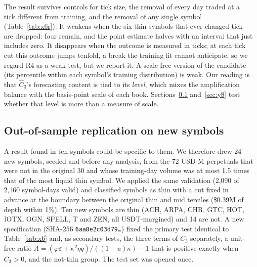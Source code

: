 \documentclass[12pt]{article}
\theoremstyle{definition}
\theoremstyle{remark}
\begin{document}
The result survives controls for tick size, the removal of every day traded at a tick different from training, and the removal of any single symbol (Table~\ref{tab:x6r}). It weakens when the six thin symbols that ever changed tick are dropped: four remain, and the point estimate halves with an interval that just includes zero. It disappears when the outcome is measured in ticks; at each tick cut this outcome jumps tenfold, a break the training fit cannot anticipate, so we regard R4 as a weak test, but we report it. A scale-free version of the candidate (its percentile within each symbol's training distribution) is weak. Our reading is that $\hat C_3$'s forecasting content is tied to its \emph{level}, which mixes the amplification balance with the basis-point scale of each book. Sections~\ref{sec:y6} and~\ref{sec:y8} test whether that level is more than a measure of scale.

\subsection{Out-of-sample replication on new symbols}\label{sec:y6}
A result found in ten symbols could be specific to them. We therefore drew 24 new symbols, seeded and before any analysis, from the 72 USD-M perpetuals that were not in the original 30 and whose training-day volume was at most 1.5 times that of the most liquid thin symbol. We applied the same validation (2{,}090 of 2{,}160 symbol-days valid) and classified symbols as thin with a cut fixed in advance at the boundary between the original thin and mid terciles (\$0.39M of depth within 1\%). Ten new symbols are thin (ACH, ARPA, CHR, GTC, HOT, IOTX, OGN, SPELL, T and ZEN, all USDT-margined) and 14 are not. A new specification (SHA-256 \texttt{6aa8e2c03d79\ldots}) fixed the primary test identical to Table~\ref{tab:x6} and, as secondary tests, the three terms of $C_3$ separately, a unit-free ratio $A=(\varphi\varepsilon+\kappa^2\eta q)/((1-a)\kappa)-1$ that is positive exactly when $C_3>0$, and the not-thin group. The test set was opened once.
\end{document}
